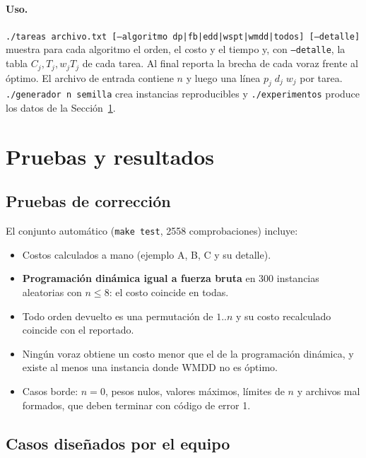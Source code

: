 \documentclass[10pt,twocolumn,letterpaper]{article}
\begin{document}
\paragraph{Uso.} \texttt{./tareas archivo.txt [--algoritmo dp|fb|edd|wspt|wmdd|todos] [--detalle]}
muestra para cada algoritmo el orden, el costo y el tiempo y, con
\texttt{--detalle}, la tabla $C_j,T_j,w_jT_j$ de cada tarea. Al final reporta
la brecha de cada voraz frente al óptimo. El archivo de entrada contiene $n$ y
luego una línea $p_j\;d_j\;w_j$ por tarea. \texttt{./generador n semilla} crea
instancias reproducibles y \texttt{./experimentos} produce los datos de la
Sección~\ref{sec:pruebas}.

\section{Pruebas y resultados}\label{sec:pruebas}

\subsection{Pruebas de corrección}

El conjunto automático (\texttt{make test}, 2558 comprobaciones) incluye:
\begin{itemize}
  \item Costos calculados a mano (ejemplo A, B, C y su detalle).
  \item \textbf{Programación dinámica igual a fuerza bruta} en 300 instancias
        aleatorias con $n\le8$: el costo coincide en todas.
  \item Todo orden devuelto es una permutación de $1..n$ y su costo
        recalculado coincide con el reportado.
  \item Ningún voraz obtiene un costo menor que el de la programación
        dinámica, y existe al menos una instancia donde WMDD no es óptimo.
  \item Casos borde: $n=0$, pesos nulos, valores máximos, límites de $n$ y
        archivos mal formados, que deben terminar con código de error 1.
\end{itemize}

\subsection{Casos diseñados por el equipo}
\end{document}
